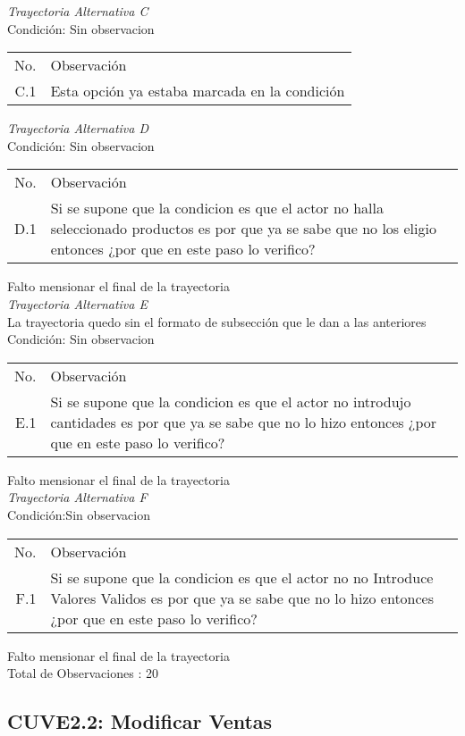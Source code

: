 \documentclass[10pt,spanish]{article}
\providecommand{\tabularnewline}{\\}
\begin{document}
\textit{Trayectoria Alternativa C}\tabularnewline
Condición: Sin observacion
\begin{longtable}{rp{8cm}}
No.  & Observación\tabularnewline
C.1  & Esta opción ya estaba marcada en la condición\tabularnewline
\end{longtable}

\textit{Trayectoria Alternativa D} \tabularnewline
Condición: Sin observacion
\begin{longtable}{rp{8cm}}
No.  & Observación\tabularnewline
D.1  & Si se supone que la condicion es que  el actor no halla seleccionado productos es por que ya se sabe que no los eligio entonces ¿por que en este paso lo verifico?\tabularnewline
\end{longtable}
Falto mensionar el final de la trayectoria \tabularnewline
\textit{Trayectoria Alternativa E}\tabularnewline
La trayectoria quedo sin el formato de subsección que le dan a las anteriores
Condición: Sin observacion
\begin{longtable}{rp{8cm}}
No.  & Observación\tabularnewline
E.1  & Si se supone que la condicion es que  el actor no introdujo cantidades es por que ya se sabe que no lo hizo entonces ¿por que en este paso lo verifico?\tabularnewline
\end{longtable}
Falto mensionar el final de la trayectoria \tabularnewline
\textit{Trayectoria Alternativa F}\tabularnewline
Condición:Sin observacion
\begin{longtable}{rp{8cm}}
No.  & Observación\tabularnewline
F.1  & Si se supone que la condicion es que  el actor no no Introduce Valores Validos es por que ya se sabe que no lo hizo entonces ¿por que en este paso lo verifico?\tabularnewline
\end{longtable}
Falto mensionar el final de la trayectoria \tabularnewline
Total de Observaciones : 20\tabularnewline
\newpage
\subsection{CUVE2.2: Modificar Ventas}

\end{document}
